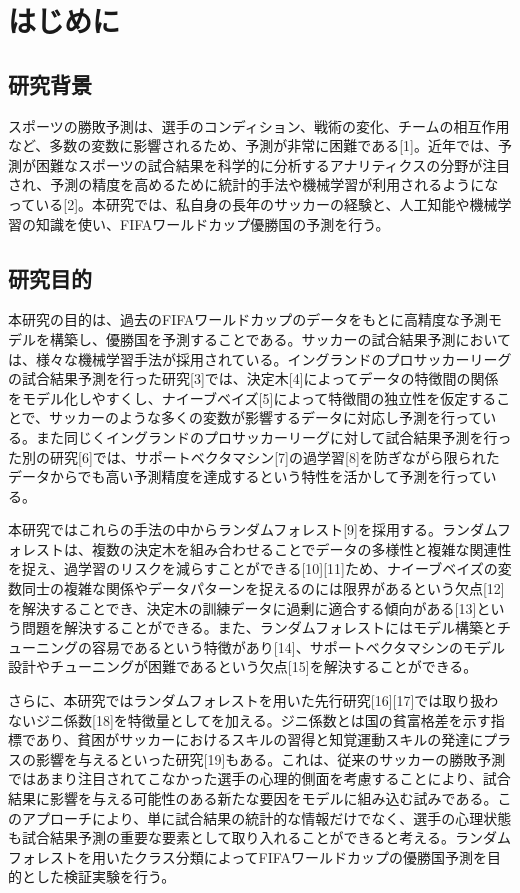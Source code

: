 \documentclass[platex]{suribt}
\begin{document}
\chapter{はじめに}
\section{研究背景}
スポーツの勝敗予測は、選手のコンディション、戦術の変化、チームの相互作用など、多数の変数に影響されるため、予測が非常に困難である[1]。近年では、予測が困難なスポーツの試合結果を科学的に分析するアナリティクスの分野が注目され、予測の精度を高めるために統計的手法や機械学習が利用されるようになっている[2]。本研究では、私自身の長年のサッカーの経験と、人工知能や機械学習の知識を使い、FIFAワールドカップ優勝国の予測を行う。
\section{研究目的}
本研究の目的は、過去のFIFAワールドカップのデータをもとに高精度な予測モデルを構築し、優勝国を予測することである。サッカーの試合結果予測においては、様々な機械学習手法が採用されている。イングランドのプロサッカーリーグの試合結果予測を行った研究[3]では、決定木[4]によってデータの特徴間の関係をモデル化しやすくし、ナイーブベイズ[5]によって特徴間の独立性を仮定することで、サッカーのような多くの変数が影響するデータに対応し予測を行っている。また同じくイングランドのプロサッカーリーグに対して試合結果予測を行った別の研究[6]では、サポートベクタマシン[7]の過学習[8]を防ぎながら限られたデータからでも高い予測精度を達成するという特性を活かして予測を行っている。\par

本研究ではこれらの手法の中からランダムフォレスト[9]を採用する。ランダムフォレストは、複数の決定木を組み合わせることでデータの多様性と複雑な関連性を捉え、過学習のリスクを減らすことができる[10][11]ため、ナイーブベイズの変数同士の複雑な関係やデータパターンを捉えるのには限界があるという欠点[12]を解決することでき、決定木の訓練データに過剰に適合する傾向がある[13]という問題を解決することができる。また、ランダムフォレストにはモデル構築とチューニングの容易であるという特徴があり[14]、サポートベクタマシンのモデル設計やチューニングが困難であるという欠点[15]を解決することができる。\par

さらに、本研究ではランダムフォレストを用いた先行研究[16][17]では取り扱わないジニ係数[18]を特徴量としてを加える。ジニ係数とは国の貧富格差を示す指標であり、貧困がサッカーにおけるスキルの習得と知覚運動スキルの発達にプラスの影響を与えるといった研究[19]もある。これは、従来のサッカーの勝敗予測ではあまり注目されてこなかった選手の心理的側面を考慮することにより、試合結果に影響を与える可能性のある新たな要因をモデルに組み込む試みである。このアプローチにより、単に試合結果の統計的な情報だけでなく、選手の心理状態も試合結果予測の重要な要素として取り入れることができると考える。ランダムフォレストを用いたクラス分類によってFIFAワールドカップの優勝国予測を目的とした検証実験を行う。
\end{document}
